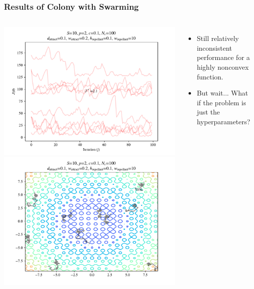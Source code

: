 \documentclass{beamer}
\begin{document}
\begin{frame}
\frametitle{Results of Colony with Swarming}
\begin{columns}
    \begin{center}
      \includegraphics[scale=0.3]{assets/rastrigin_colony_J}
      \includegraphics[scale=0.3]{assets/rastrigin_colony_theta}
    \end{center}
    \begin{itemize}
      \item Still relatively inconsistent performance for a highly nonconvex function.
      \item But wait... What if the problem is just the hyperparameters?
    \end{itemize}
\end{columns}
\end{frame}
\end{document}
